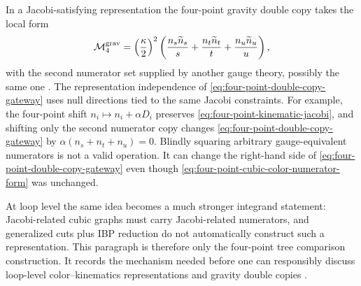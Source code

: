 \begin{construction}
In a Jacobi-satisfying representation the four-point gravity double copy
takes the local form
\begin{equation}
  \mathcal M_4^{\rm grav}
  =
  \left(\frac{\kappa}{2}\right)^2
  \left(
    \frac{n_s\widetilde n_s}{s}
    +\frac{n_t\widetilde n_t}{t}
    +\frac{n_u\widetilde n_u}{u}
  \right),
  \label{eq:four-point-double-copy-gateway}
\end{equation}
with the second numerator set supplied by another gauge theory, possibly the
same one \cite{BernCarrascoJohansson2008NewRelations}.  The representation
independence of \eqref{eq:four-point-double-copy-gateway} uses null
directions tied to the same Jacobi constraints.  For example, the
four-point shift \(n_i\mapsto n_i+\alpha D_i\) preserves
\eqref{eq:four-point-kinematic-jacobi}, and shifting only the second
numerator copy changes \eqref{eq:four-point-double-copy-gateway} by
\(\alpha(n_s+n_t+n_u)=0\).  Blindly squaring arbitrary gauge-equivalent
numerators is not a valid operation.  It can change the right-hand side of
\eqref{eq:four-point-double-copy-gateway} even though
\eqref{eq:four-point-cubic-color-numerator-form} was unchanged.

At loop level the same idea becomes a much stronger integrand statement:
Jacobi-related cubic graphs must carry Jacobi-related numerators, and
generalized cuts plus IBP reduction do not automatically construct such a
representation.  This paragraph is therefore only the four-point tree
comparison construction.  It records the mechanism needed before one can responsibly
discuss loop-level color--kinematics representations and gravity double copies
\cite{BernCarrascoJohansson2010PerturbativeQuantumGravity}.
\end{construction}

